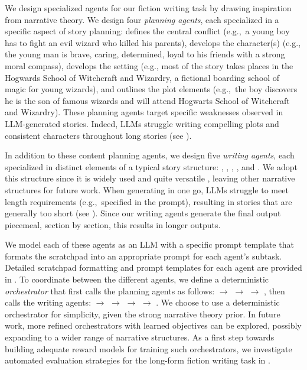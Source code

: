 \documentclass{article}
\newcommand{\mirella}[1]{{\textcolor{cyan}{\bf{Mirella:} \emph{#1}}}}
\begin{document}

We design specialized  agents for our fiction writing task by drawing inspiration from narrative theory. 
We design four \emph{planning agents}, each specialized in a specific aspect of story planning: {\sc [conflict]} defines the central conflict (e.g.,~a young boy has to fight an evil wizard who killed his parents), {\sc [character]} develops the character(s) (e.g., the young man is brave, caring, determined, loyal to his friends with a strong moral compass), {\sc [setting]} develops the setting (e.g., most of the story takes places in the Hogwards School of Witchcraft and Wizardry, a fictional boarding school of magic for young wizards), and {\sc [plot]} outlines the plot elements (e.g.,~the boy  discovers he is the son of famous wizards and will attend Hogwarts School of Witchcraft and Wizardry). These planning agents target specific weaknesses observed in LLM-generated stories. Indeed, LLMs struggle writing compelling plots and consistent characters throughout long stories (see ).

In addition to these content planning agents, we design five
\emph{writing agents}, each specialized in distinct elements of a
typical story structure: {\sc [exposition]}, {},
{\sc [climax]}, {}, and {\sc [resolution]}. We
adopt this structure since it is widely used and quite versatile
\citep{freytag1896freytag, pavis1998dictionary}, leaving other
narrative structures for future work. When generating in one go, LLMs
struggle to meet length requirements (e.g.,~specified in the prompt),
resulting in stories that are generally too short (see
).  Since our writing agents generate the final
output piecemeal, section by section, this results in longer outputs.

We model each of these agents as an LLM with a specific prompt template that formats the scratchpad into an appropriate prompt for each agent's subtask. Detailed scratchpad formatting and prompt templates for each agent are provided in . To coordinate between the different agents, we define a deterministic \emph{orchestrator} that first calls the planning agents as follows: {\sc [conflict]} $\to$ {\sc [character]} $\to$ {\sc [setting]} $\to$ {\sc [plot]}, then calls the writing agents: {\sc [exposition]} $\to$ {} $\to$ {\sc [climax]} $\to$ {} $\to$ {\sc [resolution]}. We choose to use a deterministic orchestrator for simplicity, given the strong narrative theory prior. %
In future work, more refined orchestrators with learned objectives can be explored, possibly expanding to a wider range of narrative structures. As a first step towards building adequate reward models for training such orchestrators, we investigate automated evaluation strategies for the long-form fiction writing task in  .
\end{document}
